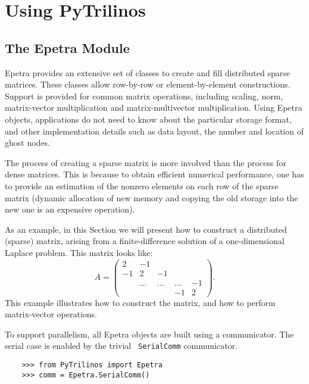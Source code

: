 \documentclass[10pt,relax]{SANDreport}
\begin{document}
\section{Using PyTrilinos}
\label{sec:using}

\subsection{The Epetra Module}
\label{subsec:epetra}

Epetra provides an extensive set of classes to create and fill
distributed sparse matrices. These classes allow row-by-row or
element-by-element constructions. Support is provided for common
matrix operations, including scaling, norm, matrix-vector
multiplication and matrix-multivector multiplication.  Using Epetra
objects, applications do not need to know about the particular storage
format, and other implementation details such as data layout, the
number and location of ghost nodes.

The process of creating a sparse matrix is more involved than the
process for dense matrices. This is because to obtain efficient
numerical performance, one has to provide an estimation of the nonzero
elements on each row of the sparse matrix (dynamic allocation of new
memory and copying the old storage into the new one is an expensive
operation).

As an example, in this Section we will present how to construct a
distributed (sparse) matrix, arising from a finite-difference solution
of a one-dimensional Laplace problem. This matrix looks like:
\begin{equation*}
  A = \begin{pmatrix}
     2 & -1     &        &        &    \\
    -1 &  2     & -1     &        &    \\
       & \ldots & \ldots & \ldots & -1 \\
       &        &        & -1     & 2
\end{pmatrix}.
\end{equation*}
This example illustrates how to construct the matrix, and how to
perform matrix-vector operations.

To support parallelism, all Epetra objects are built using a
communicator.  The serial case is enabled by the trivial {\tt
  SerialComm} communicator.
\begin{verbatim}
    >>> from PyTrilinos import Epetra
    >>> comm = Epetra.SerialComm()
\end{verbatim}
\end{document}
